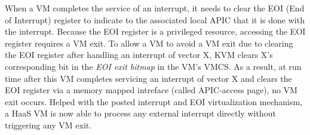 When a VM completes the service of an interrupt, it needs to clear the EOI (End of Interrupt) register to indicate to the 
associated local APIC that it is done with the interrupt. Because the EOI register is a privileged resource, accessing the EOI register
requires a VM exit. To allow a VM to avoid a VM exit due to clearing the EOI register after handling an interrupt of vector X,  KVM clears X's corresponding bit in 
the {\em EOI exit bitmap} in the VM's VMCS. As a result, at run time after this VM completes servicing an interrupt of vector X and clears the EOI register via a memory mapped 
intreface (called APIC-access page), no VM exit occurs.   
Helped with the posted interrupt and EOI virtualization mechanism, a HaaS VM is now able to process any external interrupt directly without triggering any VM exit.



 

